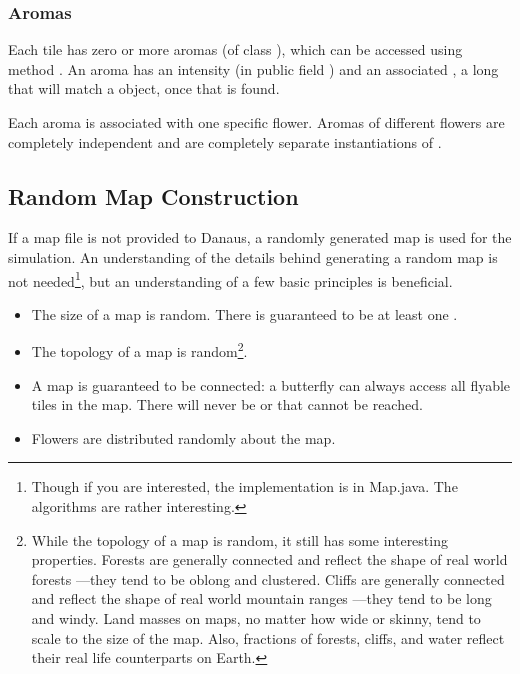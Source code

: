 \documentclass{pset}
\begin{document}
\subsubsection{Aromas}
Each tile has zero or more aromas (of class ), which can be
accessed using  method . An aroma has an
intensity (in public field ) and an associated ,
a long that will match a  object, once that  is
found.

Each aroma is associated with one specific flower. Aromas of different flowers
are completely independent and are completely separate instantiations of
.
\fi

\ifx \RANDOMMAPCONSTRUCTION \undefined \else
\subsection{Random Map Construction}\label{sec:mapconstruction}
If a map file is not provided to Danaus, a randomly generated map is used for
the simulation. An understanding of the details behind generating a random map
is not needed\footnote{Though if you are interested, the implementation is in
Map.java. The algorithms are rather interesting.}, but an understanding of a
few basic principles is beneficial.
\begin{itemize}  
    \item The size of a map is random. There is guaranteed to be at least one
        .
    \item The topology of a map is random\footnote{While the topology of a map
            is random, it still has some interesting properties. Forests are
            generally connected and reflect the shape of real world forests
            ---they tend to be oblong and clustered. Cliffs are generally
            connected and reflect the shape of real world mountain ranges
            ---they tend to be long and windy. Land masses on maps, no matter
            how wide or skinny, tend to scale to the size of the map. Also,
            fractions of forests, cliffs, and water reflect their real life
        counterparts on Earth.}.
    \item A map is guaranteed to be connected: a butterfly can always access
        all flyable tiles in the map. There will never be  or
         that cannot be reached.
    \item Flowers are distributed randomly about the map.
\end{itemize} 
\fi
\fi
\end{document}

